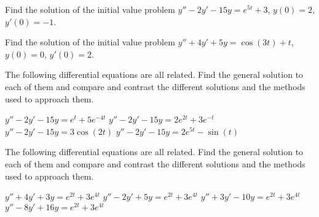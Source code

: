\documentclass{ximera}
\begin{document}
\begin{exercise}
    Find the solution of the initial value problem $y'' - 2y' - 15y = e^{5t} + 3$, $y(0) = 2$, $y'(0) = -1$. 
\end{exercise}

\begin{exercise}
    Find the solution of the initial value problem $y'' + 4y' + 5y = \cos(3t) + t$, $y(0) = 0$, $y'(0) = 2$.  
\end{exercise}

\begin{exercise}
    The following differential equations are all related. Find the general solution to each of them and compare and contrast the different solutions and the methods used to approach them.
    \begin{tasks}
        \task $y'' - 2y' - 15y = e^t + 5e^{-4t}$
        \task $y'' - 2y' - 15y = 2e^{2t} + 3e^{-t}$
        \task $y'' - 2y' - 15y = 3\cos(2t)$
        \task $y'' - 2y' - 15y = 2e^{5t} - \sin(t)$
    \end{tasks}
\end{exercise}

\begin{exercise}
    The following differential equations are all related. Find the general solution to each of them and compare and contrast the different solutions and the methods used to approach them.
    \begin{tasks}
        \task $y'' + 4y' + 3y = e^{2t} + 3e^{4t}$ 
        \task $y'' - 2y' + 5y = e^{2t} + 3e^{4t}$
        \task $y'' + 3y' - 10y = e^{2t} + 3e^{4t}$
        \task $y'' - 8y'  + 16y = e^{2t} + 3e^{4t}$
    \end{tasks}
\end{exercise}
\end{document}
